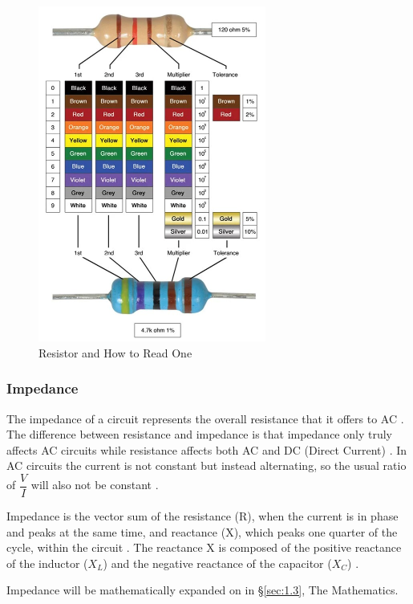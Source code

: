 \documentclass[12pt]{article}
\begin{document}
\begin{figure}[ht]
    \centering
    \includegraphics[width=7.5cm]{resistorr.jpg}
    \caption{\centering Resistor and How to Read One \protect\cite{resistorpic}}
    \label{fig:resistor}
\end{figure}

\subsubsection{Impedance} \label{sec:1.1.2}

The impedance of a circuit represents the overall resistance that it offers to AC
\cite{lionimpedance}.
The difference between resistance and impedance is that impedance only truly affects AC circuits while resistance affects both AC and DC (Direct Current)
\cite{isaacimpedance,protimpedance}.
In AC circuits the current is not constant but instead alternating, so the usual ratio of $\dfrac{V}{I}$ will also not be constant
\cite{isaacimpedance}.

Impedance is the vector sum of the resistance (R), when the current is in phase and peaks at the same time, and reactance (X), which peaks one quarter of the cycle,
within the circuit
\cite{lionimpedance,isaacimpedance}.
The reactance X is composed of the positive reactance of the inductor ($X_L$) and the negative reactance of the capacitor ($X_C$)
\cite{isaacimpedance}.

Impedance will be mathematically expanded on in §\ref{sec:1.3}, The Mathematics.
\end{document}
